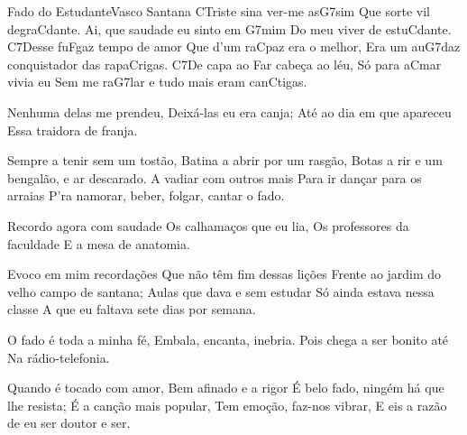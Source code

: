 \begin{musica}{Fado do Estudante}{Vasco Santana}{}
\ac{C}{Tri}ste sina ver-me as\ac{G7}{sim}
Que sorte vil degra\ac{C}{dan}te.
Ai, que saudade eu sinto em \ac{G7}{mim}
Do meu viver de estu\ac{C}{dan}te.
\ac{C7}{De}sse fu\ac{F}{gaz} tempo de amor
Que d'um ra\ac{C}{paz} era o melhor,
Era um au\ac{G7}{daz} conquistador das rapa\ac{C}{ri}gas.
\ac{C7}{De} capa ao \ac{F}{ar} cabeça ao léu,
Só para a\ac{C}{mar} vivia eu
Sem me ra\ac{G7}{lar} e tudo mais eram can\ac{C}{ti}gas.

Nenhuma delas me prendeu,
Deixá-las eu era canja;
Até ao dia em que apareceu
Essa traidora de franja.

Sempre a tenir sem um tostão,
Batina a abrir por um rasgão,
Botas a rir e um bengalão, e ar descarado.
A vadiar com outros mais
Para ir dançar para os arraias
P’ra namorar, beber, folgar, cantar o fado.

Recordo agora com saudade
Os calhamaços que eu lia,
Os professores da faculdade
E a mesa de anatomia.

Evoco em mim recordações
Que não têm fim dessas lições
Frente ao jardim do velho campo de santana;
Aulas que dava e sem estudar
Só ainda estava nessa classe
A que eu faltava sete dias por semana.

O fado é toda a minha fé,
Embala, encanta, inebria.
Pois chega a ser bonito até
Na rádio-telefonia.

Quando é tocado com amor,
Bem afinado e a rigor
É belo fado, ningém há que lhe resista;
É a canção mais popular,
Tem emoção, faz-nos vibrar,
E eis a razão de eu ser doutor e ser.

\end{musica}
